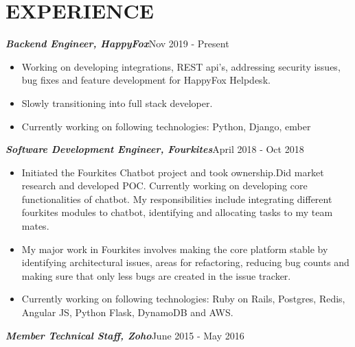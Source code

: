 \documentclass[11pt,a4paper]{article}
\begin{document}
\section*{EXPERIENCE}
\emph{\textbf {Backend Engineer, HappyFox}}{\hfill Nov 2019 - Present}
\begin{itemize}[noitemsep]
\item Working on developing integrations, REST api's, addressing security issues, bug fixes and feature development for HappyFox Helpdesk.
\item Slowly transitioning into full stack developer.
\item Currently working on following technologies: Python, Django, ember
\end{itemize}
\emph{\textbf {Software Development Engineer, Fourkites}}{\hfill April 2018 - Oct 2018}
\begin{itemize}[noitemsep]
\item  Initiated the Fourkites Chatbot project and took ownership.Did market research and developed POC. Currently working on developing core functionalities of chatbot. My responsibilities include integrating different fourkites modules to chatbot, identifying and allocating tasks to my team mates.
\item My major work in Fourkites involves making the core platform stable by identifying architectural issues, areas for refactoring, reducing bug counts and making sure that only less bugs are created in the issue tracker.
\item Currently working on following technologies: Ruby on Rails, Postgres, Redis, Angular JS, Python Flask, DynamoDB and AWS. 
\end{itemize}
\emph{\textbf {Member Technical Staff, Zoho}}{\hfill June 2015 - May 2016}
\end{document}
